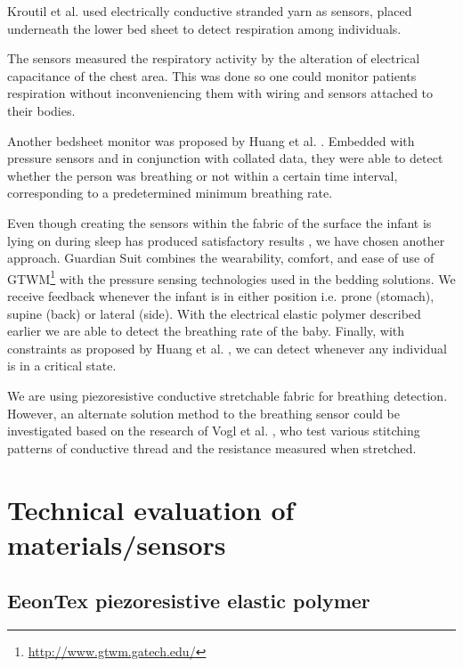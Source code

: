 \documentclass{sigchi-ext}
\begin{document}
Kroutil et al. \cite{a33-kroutil} used electrically conductive stranded yarn as sensors, placed underneath the lower bed sheet to detect respiration among individuals.

The sensors measured the respiratory activity by the alteration of electrical capacitance of the chest area. This was done so one could monitor patients respiration without inconveniencing them with wiring and sensors attached to their bodies.

Another bedsheet monitor was proposed by Huang et al. \cite{a18-huang}. Embedded with pressure sensors and in conjunction with collated data, they were able to detect whether the person was breathing or not within a certain time interval, corresponding to a predetermined minimum breathing rate.

Even though creating the sensors within the fabric of the surface the infant is lying on during sleep has produced satisfactory results \cite{a18-huang, a33-kroutil}, we have chosen another approach. Guardian Suit combines the wearability, comfort, and ease of use of GTWM\footnote{\url{http://www.gtwm.gatech.edu/}} \cite{p285-fantauzzacoffin} with the pressure sensing technologies used in the bedding solutions. We receive feedback whenever the infant is in either position i.e. prone (stomach), supine (back) or lateral (side). With the electrical elastic polymer described earlier we are able to detect the breathing rate of the baby. Finally, with constraints as proposed by Huang et al. \cite{a18-huang}, we can detect whenever any individual is in a critical state.

We are using piezoresistive conductive
stretchable fabric for breathing detection. However, an alternate solution method to the breathing sensor
could be investigated based on the research of Vogl et al. \cite{stretcheband}, who
test various stitching patterns of conductive thread and the resistance measured
when stretched.


\clearpage

\section{Technical evaluation of materials/sensors}

\subsection{EeonTex piezoresistive elastic polymer}
\end{document}
